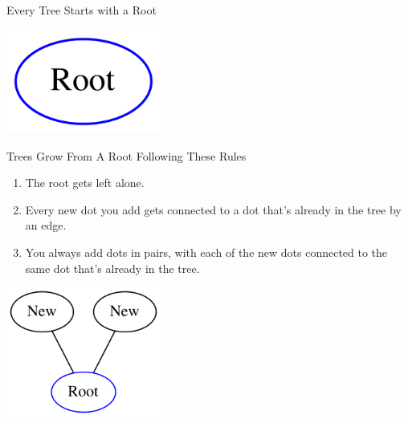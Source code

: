 \documentclass{beamer}
\begin{document}
\begin{frame}
\begin{center}
    \Large\sc
     Every Tree Starts with a Root
\end{center}
    \begin{center}
    \includegraphics[width=2in]{G0.png}
    \end{center} 
\end{frame}

\begin{frame}
\begin{center}
    \Large\sc Trees Grow From A Root Following These Rules
\end{center}
\begin{enumerate}
\item The root gets left alone.
\item Every new dot you add gets connected to a dot that's already in the tree by an edge.
\item You always add dots in pairs, with each of the new dots connected to the same dot that's already in the tree.
\end{enumerate}
\begin{center}
    \includegraphics[width=2in]{G1.png}
    \end{center}
\end{frame}
\end{document}
